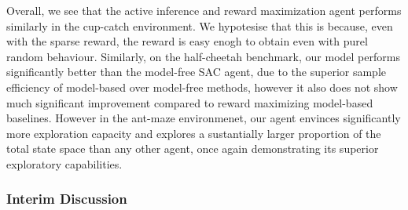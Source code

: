 Overall, we see that the active inference and reward maximization agent performs similarly in the cup-catch environment. We hypotesise that this is because, even with the sparse reward, the reward is easy enogh to obtain even with purel random behaviour. Similarly, on the half-cheetah benchmark, our model performs significantly better than the model-free SAC agent, due to the superior sample efficiency of model-based over model-free methods, however it also does not show much significant improvement compared to reward maximizing model-based baselines. However in the ant-maze environmenet, our agent envinces significantly more exploration capacity and explores a sustantially larger proportion of the total state space than any other agent, once again demonstrating its superior exploratory capabilities.

\subsubsection{Interim Discussion}



